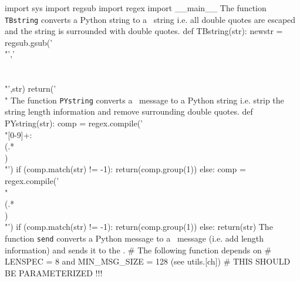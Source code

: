 import sys
import regsub
import regex
import __main__
\nwendcode{}\nwdocspar
The function \texttt{TBstring} converts a Python string to a \TB\
string i.e. all double quotes are escaped and the string is surrounded
with double quotes.
\nwenddocs{}\plusendmoddef\let\nwnotused=\nwoutput{}\nwstartdeflinemarkup{}\nwenddeflinemarkup
def TBstring(str):
        newstr = regsub.gsub('\\"','\\\\\\"',str)
        return('\\"%
\nwendcode{}\nwdocspar
The function \texttt{PYstring} converts a \TB\ message to a Python
string i.e. strip the string length information and remove surrounding 
double quotes.
\nwenddocs{}\plusendmoddef\let\nwnotused=\nwoutput{}\nwstartdeflinemarkup{}\nwenddeflinemarkup
def PYstring(str):
        comp = regex.compile('\\"[0-9]+:\\(.*\\)\\"')
        if (comp.match(str) != -1):
                return(comp.group(1))
        else:
                comp = regex.compile('\\"\\(.*\\)\\"')
                if (comp.match(str) != -1):
                        return(comp.group(1))
                else:
                        return(str)
\nwendcode{}\nwdocspar
The function \texttt{send} converts a Python message to a \TB\ message
(i.e. add length information) and sends it to the \TB.
\nwenddocs{}\plusendmoddef\let\nwnotused=\nwoutput{}\nwstartdeflinemarkup{}\nwenddeflinemarkup
# The following function depends on
# LENSPEC = 8 and MIN_MSG_SIZE = 128 (see utils.[ch])
# THIS SHOULD BE PARAMETERIZED !!!

